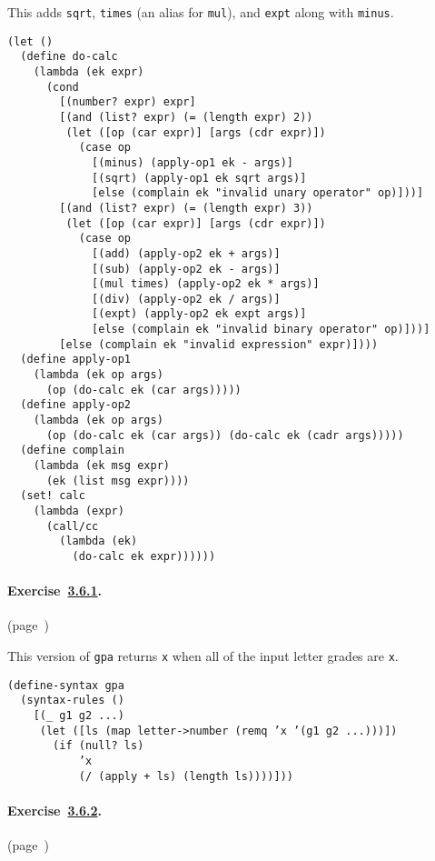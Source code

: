   This adds \texttt{sqrt}, \texttt{times} (an alias for \texttt{mul}), and \texttt{expt} along with \texttt{minus}. 
\begin{alltt}
(let ()
   (define do-calc
     (lambda (ek expr)
       (cond
         [(number? expr) expr]
         [(and (list? expr) (= (length expr) 2))
          (let ([op (car expr)] [args (cdr expr)])
            (case op
              [(minus) (apply-op1 ek - args)]
              [(sqrt) (apply-op1 ek sqrt args)]
              [else (complain ek "invalid unary operator" op)]))]
         [(and (list? expr) (= (length expr) 3))
          (let ([op (car expr)] [args (cdr expr)])
            (case op
              [(add) (apply-op2 ek + args)]
              [(sub) (apply-op2 ek - args)]
              [(mul times) (apply-op2 ek * args)]
              [(div) (apply-op2 ek / args)]
              [(expt) (apply-op2 ek expt args)]
              [else (complain ek "invalid binary operator" op)]))]
         [else (complain ek "invalid expression" expr)])))
   (define apply-op1
     (lambda (ek op args)
       (op (do-calc ek (car args)))))
   (define apply-op2
     (lambda (ek op args)
       (op (do-calc ek (car args)) (do-calc ek (cadr args)))))
   (define complain
     (lambda (ek msg expr)
       (ek (list msg expr))))
   (set! calc
     (lambda (expr)
       (call/cc
         (lambda (ek)
           (do-calc ek expr))))))
\end{alltt}



\paragraph{Exercise \hyperref[further_g85]{3.6.1}. }(page \pageref{further_s90})

  This version of \texttt{gpa} returns \texttt{x} when all of the input letter grades are \texttt{x}. 
\begin{alltt}
(define-syntax gpa
   (syntax-rules ()
     [(\_{} g1 g2 ...)
      (let ([ls (map letter-\textgreater{}number (remq 'x '(g1 g2 ...)))])
        (if (null? ls)
            'x
            (/ (apply + ls) (length ls))))]))
\end{alltt}



\paragraph{Exercise \hyperref[further_g86]{3.6.2}. }(page \pageref{further_s91})

